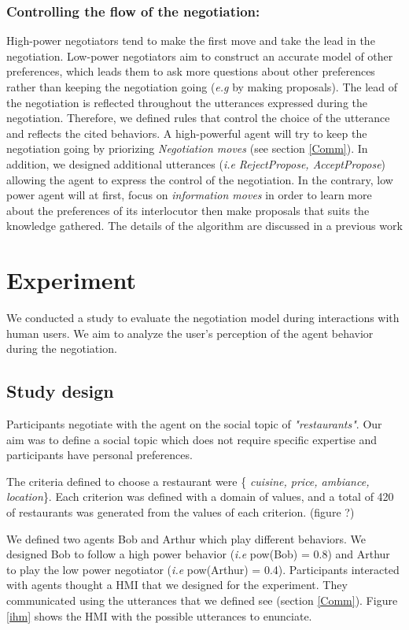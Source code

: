 \documentclass[runningheads,a4paper]{llncs}
\begin{document}
	\subsubsection{Controlling the flow of the negotiation:}
	High-power negotiators tend to make the first move \cite{magee2007power} and take the lead in the negotiation. Low-power negotiators aim to construct an accurate model of other preferences, which leads them to ask more questions about other preferences rather than keeping the negotiation going (\emph{e.g} by making proposals)\cite{de2004influence}.
	The lead of the negotiation is reflected throughout the utterances expressed during the negotiation. Therefore, we defined rules that control the choice of the utterance and reflects the cited behaviors. A high-powerful agent will try to keep the negotiation going by priorizing \emph{Negotiation moves} (see section \ref{Comm}). In addition, we designed additional utterances (\textit{i.e} \emph{RejectPropose, AcceptPropose}) allowing the agent to express the control of the negotiation.
	In the contrary, low power agent will at first, focus on \emph{information moves} in order to learn more about the preferences of its interlocutor then make proposals that suits the knowledge gathered. 
	The details of the algorithm are discussed in a previous work\cite {ouali2017computational}
	
\section{Experiment}
	We conducted a study to evaluate the negotiation model during interactions with human users. We aim to analyze the user's perception of the agent behavior during the negotiation.
	
	\subsection{Study design}
		
		Participants negotiate with the agent on the social topic of \emph{"restaurants"}. Our aim was to define a social topic which does not require specific expertise and participants have personal preferences.
		
		The criteria defined to choose a restaurant were \{ \textit{cuisine, price, ambiance, location}\}. Each criterion was defined with a domain of values, and a total of 420 of restaurants was generated from the values of each criterion. (figure ?)
		
		We defined two agents Bob and Arthur which play different behaviors. We designed Bob to follow a high power behavior (\textit{i.e} pow(Bob) = 0.8) and Arthur to play the low power negotiator (\textit{i.e} pow(Arthur) = 0.4).
		Participants interacted with agents thought a HMI that we designed for the experiment. They communicated using the utterances that we defined see (section \ref{Comm}). Figure \ref{ihm} shows the HMI with the possible utterances to enunciate.
		
\end{document}
